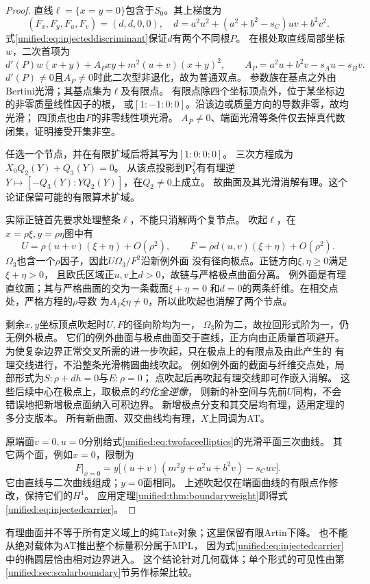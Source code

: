 \documentclass[11pt,a4paper,oneside]{ctexart}
\theoremstyle{cnplain}
\theoremstyle{definition}
\theoremstyle{remark}
\numberwithin{equation}{section}
\begin{document}
\begin{proof}
直线$\ell=\{x=y=0\}$包含于$S_0$。其上梯度为
\[
 (F_x,F_y,F_u,F_v)=(d,d,0,0),\quad
 d=a^2u^2+(a^2+b^2-s_C)uv+b^2v^2.
\]
式\eqref{unified:eq:injecteddiscriminant}保证$d$有两个不同根$P$。
在根处取直线局部坐标$w$，二次首项为
\[
 d'(P)w(x+y)+A_Pxy+m^2(u+v)(x+y)^2,
 \qquad A_P=a^2u+b^2v-s_Au-s_Bv.
\]
$d'(P)\ne0$且$A_P\ne0$时此二次型非退化，故为普通双点。
参数族在基点之外由Bertini光滑；其基点集为$\ell$及有限点。
有限点除四个坐标顶点外，位于某坐标边的非零质量线性因子的根，
或$[1:-1:0:0]$。沿该边或质量方向的导数非零，故均光滑；
四顶点也由$F$的非零线性项光滑。
$A_P\ne0$、端面光滑等条件仅去掉真代数闭集，证明接受开集非空。

任选一个节点，并在有限扩域后将其写为$[1:0:0:0]$。
三次方程成为$X_0Q_2(Y)+Q_3(Y)=0$。
从该点投影到$\mathbf P^2_Y$有有理逆
$Y\mapsto[-Q_3(Y):YQ_2(Y)]$，在$Q_2\ne0$上成立。
故曲面及其光滑消解有理。这个论证保留可能的有限算术扩域。

实际正链首先要求处理整条$\ell$，不能只消解两个复节点。
吹起$\ell$，在$x=\rho\xi,y=\rho\eta$图中有
\[
 U=\rho(u+v)(\xi+\eta)+O(\rho^2),\qquad
 F=\rho d(u,v)(\xi+\eta)+O(\rho^2).
\]
$\Omega_3$也含一个$\rho$因子，因此$U\Omega_3/F^2$沿新例外面
没有径向极点。正链方向$\xi,\eta\ge0$满足$\xi+\eta>0$，
且欧氏区域正$u,v$上$d>0$，故链与严格极点曲面分离。
例外面是有理直纹面；其与严格曲面的交为一条截面$\xi+\eta=0$
和$d=0$的两条纤维。在相交点处，严格方程的$\rho$导数
为$A_P\xi\eta\ne0$，所以此吹起也消解了两个节点。

剩余$x,y$坐标顶点吹起时$U,F$的径向阶均为一，
$\Omega_3$阶为二，故拉回形式阶为一，仍无例外极点。
它们的例外曲面与极点曲面交于直线，正方向由正质量首项避开。
为使复杂边界正常交叉所需的进一步吹起，只在极点上的有限点及由此产生的
有理交线进行，不沿整条光滑椭圆曲线吹起。
例如例外面的截面与纤维交点处，局部形式为$S:\rho+dh=0$与$E:\rho=0$；
点吹起后再吹起有理交线即可作嵌入消解。
这些后续中心在极点上，取极点的\emph{约化全逆像}，
则新的补空间与先前$U$同构，不会错误地把新增极点面纳入可积边界。
新增极点分支和其交层均有理，适用定理的多分支版本。
所有新曲面、双交曲线均有理，$X$上同调为AT。

原端面$v=0,u=0$分别给式\eqref{unified:eq:twofaceelliptics}的光滑平面三次曲线。
其它两个面，例如$x=0$，限制为
\[
 F|_{x=0}=y\bigl[(u+v)(m^2y+a^2u+b^2v)-s_Cuv\bigr].
\]
它由直线与二次曲线组成；$y=0$面相同。
上述吹起仅在端面曲线的有限点作修改，保持它们的$H^1$。
应用定理\ref{unified:thm:boundaryweight}即得式\eqref{unified:eq:injectedcarrier}。
\end{proof}

有理曲面并不等于所有定义域上的纯Tate对象；这里保留有限Artin下降。
也不能从绝对载体为AT推出整个标量积分属于MPL，
因为式\eqref{unified:eq:injectedcarrier}中的椭圆层恰由相对边界进入。
这个结论针对几何载体；单个形式的可见性由第\ref{unified:sec:scalarboundary}节另作标架比较。
\end{document}
